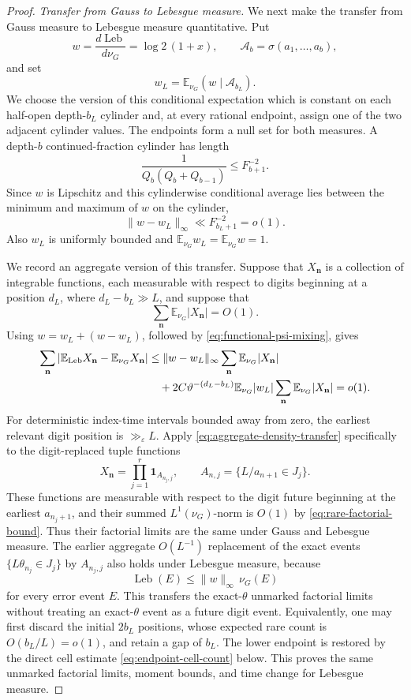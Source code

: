 \documentclass[11pt]{article}
\numberwithin{equation}{section}
\theoremstyle{definition}
\newcommand{\E}{\mathbb E}
\newcommand{\1}{\mathbf 1}
\newcommand{\Leb}{\operatorname{Leb}}
\begin{document}
\begin{proof}
\medskip
\noindent\emph{Transfer from Gauss to Lebesgue measure.}
We next make the transfer from Gauss measure to Lebesgue measure
quantitative.  Put
\[
 w=\frac{d\Leb}{d\nu_G}=\log2\,(1+x),\qquad
 \mathscr A_b=\sigma(a_1,\ldots,a_b),
\]
and set
\[
 w_L=\E_{\nu_G}(w\mid\mathscr A_{b_L}).
\]
We choose the version of this conditional expectation which is constant
on each half-open depth-\(b_L\) cylinder and, at every rational endpoint,
assign one of the two adjacent cylinder values.  The endpoints form a
null set for both measures.
A depth-\(b\) continued-fraction cylinder has length
\[
 \frac1{Q_b(Q_b+Q_{b-1})}\le F_{b+1}^{-2}.
\]
Since \(w\) is Lipschitz and this cylinderwise conditional average lies
between the minimum and maximum of \(w\) on the cylinder,
\begin{equation}\label{eq:density-cylinder-approximation}
 \|w-w_L\|_\infty\ll F_{b_L+1}^{-2}=o(1).
\end{equation}
Also \(w_L\) is uniformly bounded and
\(\E_{\nu_G}w_L=\E_{\nu_G}w=1\).

We record an aggregate version of this transfer.  Suppose that
\(X_{\mathbf n}\) is a collection of integrable functions, each
measurable with respect to digits beginning at a position \(d_L\), where
\(d_L-b_L\gg L\), and suppose that
\[
 \sum_{\mathbf n}\E_{\nu_G}|X_{\mathbf n}|=O(1).
\]
Using \(w=w_L+(w-w_L)\), followed by
\eqref{eq:functional-psi-mixing}, gives
\begin{align}
 \sum_{\mathbf n}
 \left|\E_{\rm Leb}X_{\mathbf n}
       -\E_{\nu_G}X_{\mathbf n}\right|
 &\le
 \|w-w_L\|_\infty
 \sum_{\mathbf n}\E_{\nu_G}|X_{\mathbf n}| \notag\\
 &\quad+
 2C\vartheta^{-(d_L-b_L)}
 \E_{\nu_G}|w_L|
 \sum_{\mathbf n}\E_{\nu_G}|X_{\mathbf n}|
 =o(1).
 \label{eq:aggregate-density-transfer}
\end{align}
For deterministic index-time intervals bounded away from zero, the
earliest relevant digit position is \(\gg_\varepsilon L\).  Apply
\eqref{eq:aggregate-density-transfer} specifically to the
digit-replaced tuple functions
\[
 X_{\mathbf n}=\prod_{j=1}^r
 \1_{A_{n_j,j}},\qquad
 A_{n,j}=\{L/a_{n+1}\in J_j\}.
\]
These functions are measurable with respect to the digit future
beginning at the earliest \(a_{n_j+1}\), and their summed
\(L^1(\nu_G)\)-norm is \(O(1)\) by
\eqref{eq:rare-factorial-bound}.  Thus their factorial limits are the
same under Gauss and Lebesgue measure.  The earlier aggregate
\(O(L^{-1})\) replacement of the exact events
\(\{L\theta_{n_j}\in J_j\}\) by \(A_{n_j,j}\) also holds under
Lebesgue measure, because
\[
 \Leb(E)\le\|w\|_\infty\,\nu_G(E)
\]
for every error event \(E\).  This transfers the exact-\(\theta\)
unmarked factorial limits without treating an exact-\(\theta\) event
as a future digit event.  Equivalently, one may first discard the
initial \(2b_L\) positions, whose expected rare count is
\(O(b_L/L)=o(1)\), and retain a gap of \(b_L\).  The lower endpoint is
restored by the direct cell estimate \eqref{eq:endpoint-cell-count}
below.  This proves the same unmarked factorial limits, moment bounds,
and time change for Lebesgue measure.


\end{proof}
\end{document}
